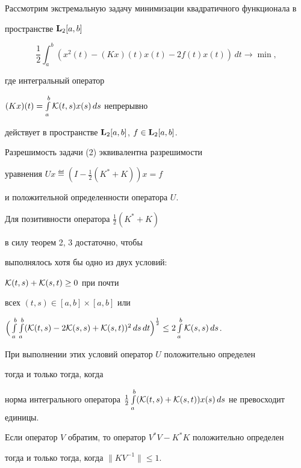 \begin{exam}


Рассмотрим экстремальную задачу минимизации квадратичного функционала в


пространстве ${\bold L}_2[a,b]$


\begin{equation}


\frac12\int_a^b\left(x^2(t)-(Kx)(t)x(t)-2f(t)x(t)\right)\,dt


\longrightarrow\min,


\end{equation}


где интегральный оператор


$(Kx)(t)=\int\limits_a^b{\cal K}(t,s)x(s)\,ds$ непрерывно


действует в пространстве ${\bold L}_2[a,b]$, $f\in{\bold L}_2[a,b]$.


Разрешимость задачи (2) эквивалентна разрешимости


уравнения $Ux\eqdef(I-\frac12(K^*+K))x=f$


и положительной определенности оператора $U$.


Для позитивности оператора $\frac12(K^*+K)$


в силу теорем 2, 3 достаточно, чтобы


выполнялось хотя бы одно из двух условий:


${\cal K}(t,s)+{\cal K}(s,t)\ge0$ при почти


всех $(t,s)\in[a,b]\times[a,b]$ или


$\Big(\int\limits_a^b\int\limits_a^b({\cal


K}(t,s)-2{\cal K}(s,s)+ {\cal


K}(s,t))^2\,ds\,dt\Big)^{\frac12}\le2\int\limits_a^b{\cal K}(s,s)\,ds$.


При выполнении этих условий оператор $U$ положительно определен 


тогда и только тогда, когда


норма интегрального оператора $\frac12\int\limits_a^b({\cal K}(t,s)+{\cal


K}(s,t))x(s)\,ds$ не превосходит единицы.


\end{exam}





\begin{cor}


Если оператор $V$ обратим, то оператор $V^*V-K^*K$ положительно определен


тогда и только тогда, когда $\|KV^{-1}\|\le1$.


\end{cor}





